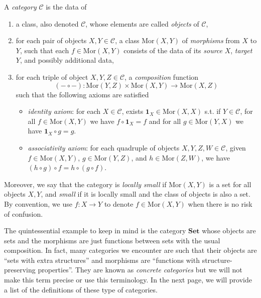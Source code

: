 \documentclass[11pt]{book}
\begin{document}
\begin{definition}A \textit{category} $\mathcal C$ is the data of
\begin{enumerate}[label=(\roman*)]
	\item a class, also denoted $\mathcal C$, whose elements are called \textit{objects} of $\mathcal C$,
	\item for each pair of objects $X,Y\in \mathcal C$, a class $\mathrm{Mor}(X,Y)$ of \textit{morphisms} from $X$ to $Y$, such that each $f\in \mathrm{Mor}(X,Y)$ consists of the data of its \textit{source} $X$, \textit{target} $Y$, and possibly additional data,
	\item for each triple of object $X,Y,Z\in\mathcal C$, a \textit{composition} function 
	\[(-\circ -):\mathrm{Mor}(Y,Z)\times\mathrm{Mor}(X,Y)\rightarrow \mathrm{Mor}(X,Z)\]
	such that the following axioms are satisfied
	\begin{itemize}
		\item \textit{identity axiom}: for each $X\in\mathcal{C}$, exists $\mathbf 1_X\in\mathrm{Mor}(X,X)$ s.t. if $Y\in\mathcal C$, for all $f\in\mathrm{Mor}(X,Y)$ we have $f\circ \mathbf 1_X=f$ and for all $g\in \mathrm{Mor}(Y,X)$ we have $\mathbf 1_X\circ g=g$.
		\item \textit{associativity axiom}: for each quadruple of objects $X,Y,Z,W\in \mathcal C$, given $f\in \mathrm{Mor}(X,Y)$, $g\in \mathrm{Mor}(Y,Z)$, and $h\in\mathrm{Mor}(Z,W)$, we have $(h\circ g)\circ f=h\circ (g\circ f)$.
	\end{itemize}
\end{enumerate}
Moreover, we say that the category is \textit{locally small} if $\mathrm{Mor}(X,Y)$ is a set for all objects $X,Y$, and \textit{small} if it is locally small and the class of objects is also a set. By convention, we use $f:X\rightarrow Y$ to denote $f\in\mathrm{Mor}(X,Y)$ when there is no risk of confusion. 
\end{definition}
\begin{example}The quintessential example to keep in mind is the category $\mathbf{Set}$ whose objects are sets and the morphisms are just functions between sets with the usual composition. In fact, many categories we encounter are such that their objects are ``sets with extra structures'' and morphisms are ``functions with structure-preserving properties''. They are known as \textit{concrete categories} but we will not make this term precise or use this terminology. In the next page, we will provide a list of the definitions of these type of categories.
\end{example}
\end{document}
